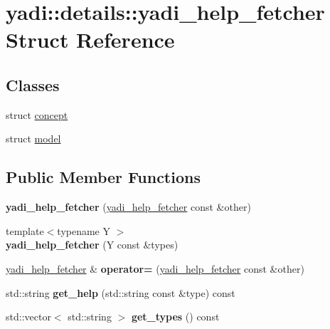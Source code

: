 \hypertarget{structyadi_1_1details_1_1yadi__help__fetcher}{}\section{yadi\+:\+:details\+:\+:yadi\+\_\+help\+\_\+fetcher Struct Reference}
\label{structyadi_1_1details_1_1yadi__help__fetcher}
\subsection*{Classes}
\begin{DoxyCompactItemize}
\item 
struct \hyperlink{structyadi_1_1details_1_1yadi__help__fetcher_1_1concept}{concept}
\item 
struct \hyperlink{structyadi_1_1details_1_1yadi__help__fetcher_1_1model}{model}
\end{DoxyCompactItemize}
\subsection*{Public Member Functions}
\begin{DoxyCompactItemize}
\item 
\mbox{\label{structyadi_1_1details_1_1yadi__help__fetcher_a5f8b1e45b37c8aa71ddfefeeaf8d05bf}} 
{\bfseries yadi\+\_\+help\+\_\+fetcher} (\hyperlink{structyadi_1_1details_1_1yadi__help__fetcher}{yadi\+\_\+help\+\_\+fetcher} const \&other)
\item 
\mbox{\label{structyadi_1_1details_1_1yadi__help__fetcher_a0d919e20c92d45110827975ae7127f5f}} 
{\footnotesize template$<$typename Y $>$ }\\{\bfseries yadi\+\_\+help\+\_\+fetcher} (Y const \&types)
\item 
\mbox{\label{structyadi_1_1details_1_1yadi__help__fetcher_a74c236f0e49bd623a75b49ca3dbd201a}} 
\hyperlink{structyadi_1_1details_1_1yadi__help__fetcher}{yadi\+\_\+help\+\_\+fetcher} \& {\bfseries operator=} (\hyperlink{structyadi_1_1details_1_1yadi__help__fetcher}{yadi\+\_\+help\+\_\+fetcher} const \&other)
\item 
\mbox{\label{structyadi_1_1details_1_1yadi__help__fetcher_a16119e731cb7fcb5775ed36a570fefa5}} 
std\+::string {\bfseries get\+\_\+help} (std\+::string const \&type) const
\item 
\mbox{\label{structyadi_1_1details_1_1yadi__help__fetcher_a5170a74f42bd371aa9eb40871d793478}} 
std\+::vector$<$ std\+::string $>$ {\bfseries get\+\_\+types} () const
\end{DoxyCompactItemize}


